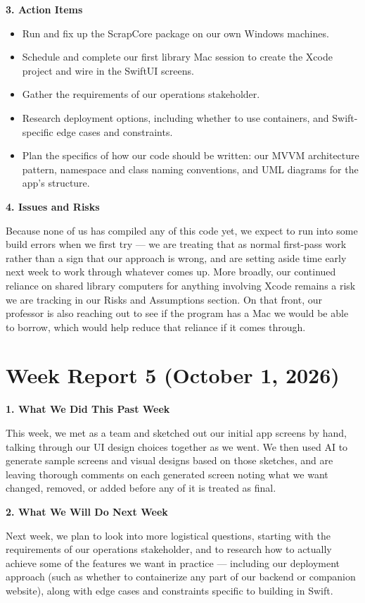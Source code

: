 \noindent\textbf{3. Action Items}
\begin{itemize}
\item Run and fix up the ScrapCore package on our own Windows machines.
\item Schedule and complete our first library Mac session to create the Xcode project and wire in the SwiftUI screens.
\item Gather the requirements of our operations stakeholder.
\item Research deployment options, including whether to use containers, and Swift-specific edge cases and constraints.
\item Plan the specifics of how our code should be written: our MVVM architecture pattern, namespace and class naming conventions, and UML diagrams for the app's structure.
\end{itemize}

\noindent\textbf{4. Issues and Risks}

Because none of us has compiled any of this code yet, we expect to run into some build errors when we first try --- we are treating that as normal first-pass work rather than a sign that our approach is wrong, and are setting aside time early next week to work through whatever comes up. More broadly, our continued reliance on shared library computers for anything involving Xcode remains a risk we are tracking in our Risks and Assumptions section. On that front, our professor is also reaching out to see if the program has a Mac we would be able to borrow, which would help reduce that reliance if it comes through.

\section{Week Report 5 (October 1, 2026)}

\noindent\textbf{1. What We Did This Past Week}

This week, we met as a team and sketched out our initial app screens by hand, talking through our UI design choices together as we went. We then used AI to generate sample screens and visual designs based on those sketches, and are leaving thorough comments on each generated screen noting what we want changed, removed, or added before any of it is treated as final.

\noindent\textbf{2. What We Will Do Next Week}

Next week, we plan to look into more logistical questions, starting with the requirements of our operations stakeholder, and to research how to actually achieve some of the features we want in practice --- including our deployment approach (such as whether to containerize any part of our backend or companion website), along with edge cases and constraints specific to building in Swift.

